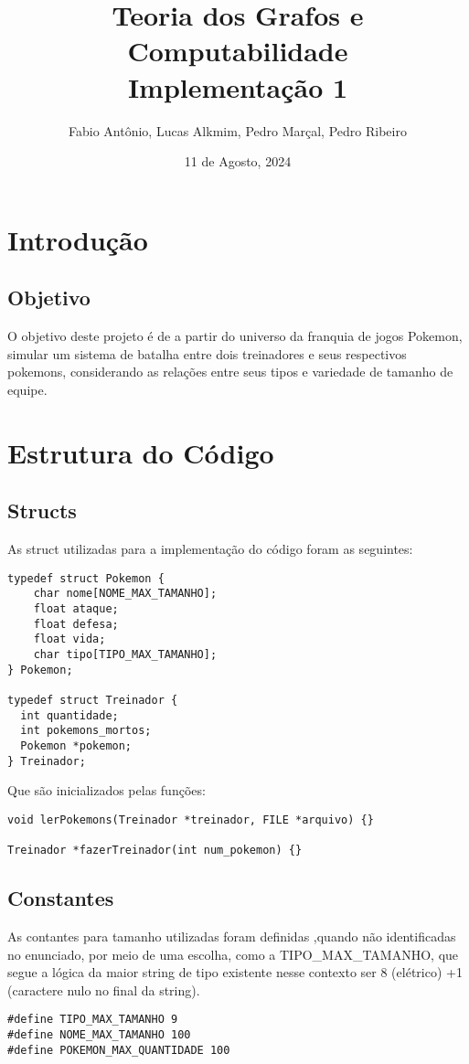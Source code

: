 \documentclass{article}
\title{\Huge{Teoria dos Grafos e Computabilidade}\\Implementação 1}
\author{{Fabio Antônio, Lucas Alkmim, Pedro Marçal, Pedro Ribeiro}}
\date{11 de Agosto, 2024}
\begin{document}
\maketitle
\newpage

\renewcommand{\contentsname}{Conteúdo}
\tableofcontents

\pagebreak

\section{Introdução}

\subsection{Objetivo}
O objetivo deste projeto é de a partir do universo da franquia de jogos Pokemon, simular um sistema de batalha entre dois treinadores e seus respectivos pokemons, considerando as relações entre seus tipos e variedade de tamanho de equipe.

\section{Estrutura do Código}

\subsection{Structs}

As struct utilizadas para a implementação do código foram as seguintes:

\begin{lstlisting} 
typedef struct Pokemon {
	char nome[NOME_MAX_TAMANHO];
	float ataque;
	float defesa;
	float vida;
	char tipo[TIPO_MAX_TAMANHO];
} Pokemon;

typedef struct Treinador {
  int quantidade;
  int pokemons_mortos;
  Pokemon *pokemon;
} Treinador;

\end{lstlisting}
Que são inicializados pelas funções:

\begin{lstlisting}
void lerPokemons(Treinador *treinador, FILE *arquivo) {}

Treinador *fazerTreinador(int num_pokemon) {}
\end{lstlisting}
\subsection{Constantes}
As contantes para tamanho utilizadas foram definidas ,quando não identificadas no enunciado, por meio de uma escolha, como a TIPO\_MAX\_TAMANHO, que segue a lógica da maior string de tipo existente nesse contexto ser 8 (elétrico) +1 (caractere nulo no final da string).
\begin{lstlisting}
#define TIPO_MAX_TAMANHO 9
#define NOME_MAX_TAMANHO 100
#define POKEMON_MAX_QUANTIDADE 100
\end{lstlisting}
\end{document}
